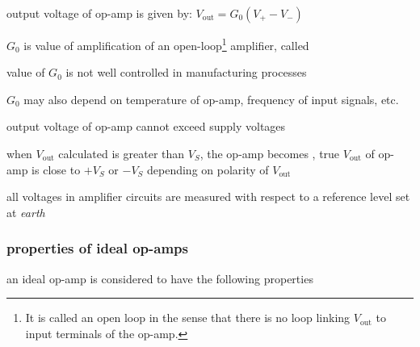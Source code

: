 \cmt output voltage of op-amp is given by: $\boxed{V_\text{out}= G_0(V_+ - V_-)}$

$G_0$ is value of amplification of an open-loop\footnote{It is called an open loop in the sense that there is no loop linking $V_\text{out}$ to input terminals of the op-amp.} amplifier, called 

\cmt value of $G_0$ is not well controlled in manufacturing processes

$G_0$ may also depend on temperature of op-amp, frequency of input signals, etc.

\cmt output voltage of op-amp cannot exceed supply voltages

when $V_\text{out}$ calculated is greater than $V_S$, the op-amp becomes , true $V_\text{out}$ of op-amp is close to $+V_S$ or $-V_S$ depending on polarity of $V_\text{out}$

\cmt all voltages in amplifier circuits are measured with respect to a reference level set at \emph{earth}

\subsubsection*{properties of ideal op-amps}

an ideal op-amp is considered to have the following properties

